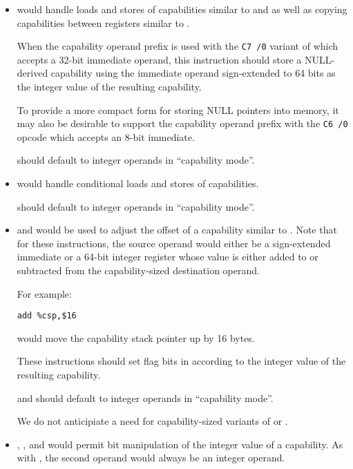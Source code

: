 \begin{itemize}
  \item {} would handle loads and stores of
    capabilities similar to  and  as well as
    copying capabilities between registers similar to .

    When the capability operand prefix is used with the \texttt{C7 /0}
    variant of  which accepts a 32-bit immediate
    operand, this instruction should store a NULL-derived capability
    using the immediate operand sign-extended to 64 bits as the
    integer value of the resulting capability.

    To provide a more compact form for storing NULL pointers into
    memory, it may also be desirable to support the capability operand
    prefix with the \texttt{C6 /0} opcode which accepts an 8-bit
    immediate.

     should default to integer operands in ``capability
    mode''.

  \item {} would handle conditional loads and stores of
    capabilities.

     should default to integer operands in
    ``capability mode''.

  \item {} and  would be used to adjust
    the offset of a capability similar to .  Note
    that for these instructions, the source operand would either be a
    sign-extended immediate or a 64-bit integer register whose value
    is either added to or subtracted from the capability-sized
    destination operand.

    For example:
 
\begin{verbatim}
add %csp,$16
\end{verbatim}

    would move the capability stack pointer up by 16 bytes.

    These instructions should set flag bits in \RFLAGS{} according to
    the integer value of the resulting capability.

     and  should default to integer
    operands in ``capability mode''.

    We do not anticipiate a need for capability-sized variants of
     or .

  \item {}, , and  would
    permit bit manipulation of the integer value of a capability.  As
    with , the second operand would always be an
    integer operand.


\end{itemize}
